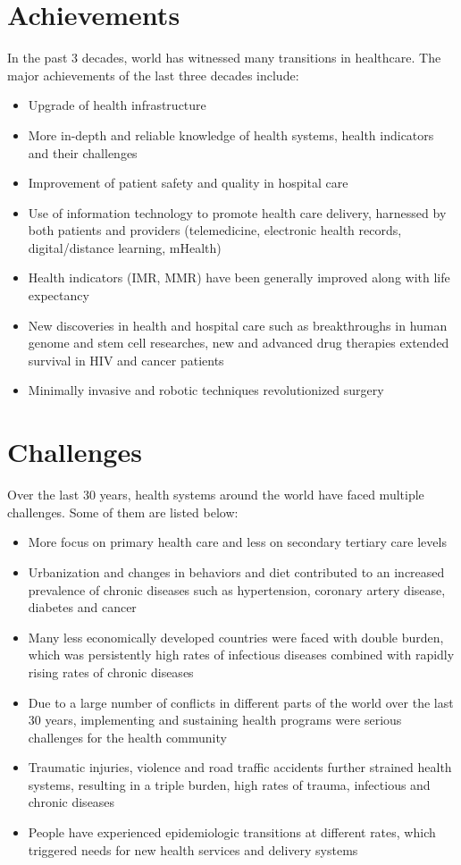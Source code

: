 \documentclass{article}
\begin{document}
 \section{Achievements}
 In the past 3 decades, world has witnessed many transitions in healthcare. The major achievements of the last three decades include:
 \begin{itemize}
 
\item Upgrade of health infrastructure
\item More in-depth and reliable knowledge of health systems, health indicators and their challenges
\item Improvement of patient safety and quality in hospital care
\item Use of information technology to promote health care delivery, harnessed by both patients and providers (telemedicine, electronic health records, digital/distance learning, mHealth)
\item Health indicators (IMR, MMR) have been generally improved along with life expectancy
\item New discoveries in health and hospital care such as breakthroughs in human genome and stem cell researches, new and advanced drug therapies extended survival in HIV and cancer patients
\item Minimally invasive and robotic techniques revolutionized surgery

\end{itemize}
\section{Challenges}
Over the last 30 years, health systems around the world have faced multiple challenges. Some of them are listed below:
\begin{itemize}
\item More focus on primary health care and less on secondary tertiary care levels
\item Urbanization and changes in behaviors and diet contributed to an increased prevalence of chronic diseases such as hypertension, coronary artery disease, diabetes and cancer
\item Many less economically developed countries were faced with double burden, which was persistently high rates of infectious diseases combined with rapidly rising rates of chronic diseases
\item Due to a large number of conflicts in different parts of the world over the last 30 years, implementing and sustaining health programs were serious challenges for the health community 
\item  Traumatic injuries, violence and road traffic accidents further strained health systems, resulting in a triple burden, high rates of trauma, infectious and chronic diseases
\item  People have experienced epidemiologic transitions at different rates, which triggered needs for new health services and delivery systems
\end{itemize}
\end{document}

